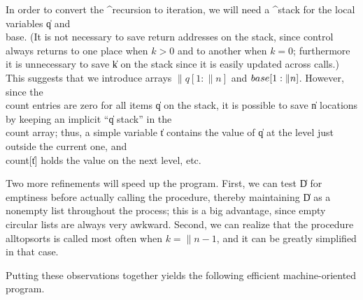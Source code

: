 In order to convert the ^{recursion to iteration}, we will need a ^{stack}
for the local variables \|q and \\{base}. (It is not necessary to save
return addresses on the stack, since control always returns to one place
when $k > 0$ and to another when $k = 0$; furthermore it is unnecessary to
save \|k on the stack since it is easily updated across calls.) This
suggests that we introduce arrays $\|q[1:\|n]$ and $\\{base}[1:\|n]$.  However,
since the \\{count} entries are zero for all items \|q on the stack, it is
possible to save \|n locations by keeping an implicit ``\|q stack'' in the
\\{count} array; thus, a simple variable \|t contains the value of \|q at the
level just outside the current one, and \\{count}[\|t] holds the value on
the next level, etc.

Two more refinements will speed up the program.
First, we can test \|D for emptiness before actually calling the procedure,
thereby maintaining \|D as a nonempty list throughout the process; this
is a big advantage, since empty circular lists are always very
awkward. Second, we can realize that the procedure \\{alltopsorts} is
called most often when $k = \|n - 1$, and it can be greatly simplified in
that case.  

Putting these observations together yields the following
efficient machine-oriented program.

